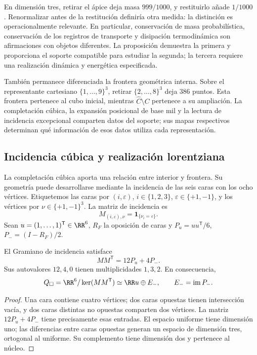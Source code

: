 En dimensión tres, retirar el ápice deja masa \(999/1000\), y
restituirlo añade \(1/1000\). Renormalizar antes de la restitución
definiría otra medida: la distinción es operacionalmente relevante.
En particular, conservación de masa probabilística, conservación de los
registros de transporte y disipación termodinámica son afirmaciones con
objetos diferentes. La proposición demuestra la primera y proporciona el
soporte compatible para estudiar la segunda; la tercera requiere una
realización dinámica y energética especificada.

También permanece diferenciada la frontera geométrica interna.
Sobre el representante cartesiano \(\{1,\ldots,9\}^3\), retirar
\(\{2,\ldots,8\}^3\) deja \(386\) puntos. Esta frontera pertenece al
cubo inicial, mientras \(\widehat C\setminus C\) pertenece a su
ampliación. La completación cúbica, la expansión posicional de base mil y
la lectura de incidencia excepcional comparten datos del soporte;
sus mapas respectivos determinan qué información de esos datos utiliza
cada representación.




\subsection{Incidencia cúbica y realización lorentziana}

La completación cúbica aporta una relación entre interior y frontera.
Su geometría puede desarrollarse mediante la incidencia de las seis caras
con los ocho vértices. Etiquetemos las caras por \((i,\varepsilon)\),
\(i\in\{1,2,3\}\), \(\varepsilon\in\{+1,-1\}\), y los vértices por
\(\nu\in\{+1,-1\}^3\). La matriz de incidencia es
\[
 M_{(i,\varepsilon),\nu}=\mathbf1_{\{\nu_i=\varepsilon\}}.
\]
Sean \(u=(1,\ldots,1)^{\mathsf T}\in\RR^6\), \(R_F\) la oposición de
caras y \(P_u=uu^{\mathsf T}/6\), \(P_-=(I-R_F)/2\).

\begin{proposition}
El Gramiano de incidencia satisface
\[
 MM^{\mathsf T}=12P_u+4P_-.
\]
Sus autovalores \(12,4,0\) tienen multiplicidades \(1,3,2\).
En consecuencia,
\[
 Q_\square=\RR^6/\ker(MM^{\mathsf T})
 \simeq\RR u\oplus E_-,\qquad E_-=\operatorname{im}P_-.
\]
\end{proposition}
\begin{proof}
Una cara contiene cuatro vértices; dos caras opuestas tienen intersección
vacía, y dos caras distintas no opuestas comparten dos vértices.
La matriz \(12P_u+4P_-\) tiene precisamente esas entradas.
El espacio uniforme tiene dimensión uno; las diferencias entre caras
opuestas generan un espacio de dimensión tres, ortogonal al uniforme.
Su complemento tiene dimensión dos y pertenece al núcleo.
\end{proof}


